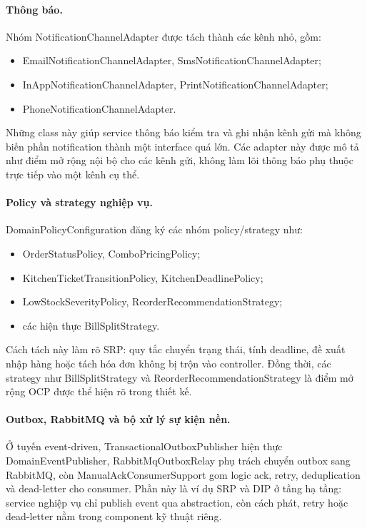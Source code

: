 \paragraph{Thông báo.}
Nhóm \textsf{NotificationChannelAdapter} được tách thành các kênh nhỏ, gồm:
\begin{itemize}
  \item \textsf{EmailNotificationChannelAdapter}, \textsf{SmsNotificationChannelAdapter};
  \item \textsf{InAppNotificationChannelAdapter}, \textsf{PrintNotificationChannelAdapter};
  \item \textsf{PhoneNotificationChannelAdapter}.
\end{itemize}
Những class này giúp service thông báo kiểm tra và ghi nhận kênh gửi mà không biến phần notification thành một interface quá lớn. Các adapter này được mô tả như điểm mở rộng nội bộ cho các kênh gửi, không làm lõi thông báo phụ thuộc trực tiếp vào một kênh cụ thể.

\paragraph{Policy và strategy nghiệp vụ.}
\textsf{DomainPolicyConfiguration} đăng ký các nhóm policy/strategy như:
\begin{itemize}
  \item \textsf{OrderStatusPolicy}, \textsf{ComboPricingPolicy};
  \item \textsf{KitchenTicketTransitionPolicy}, \textsf{KitchenDeadlinePolicy};
  \item \textsf{LowStockSeverityPolicy}, \textsf{ReorderRecommendationStrategy};
  \item các hiện thực \textsf{BillSplitStrategy}.
\end{itemize}
Cách tách này làm rõ SRP: quy tắc chuyển trạng thái, tính deadline, đề xuất nhập hàng hoặc tách hóa đơn không bị trộn vào controller. Đồng thời, các strategy như \textsf{BillSplitStrategy} và \textsf{ReorderRecommendationStrategy} là điểm mở rộng OCP được thể hiện rõ trong thiết kế.

\paragraph{Outbox, RabbitMQ và bộ xử lý sự kiện nền.}
Ở tuyến event-driven, \textsf{TransactionalOutboxPublisher} hiện thực \textsf{DomainEventPublisher}, \textsf{RabbitMqOutboxRelay} phụ trách chuyển outbox sang RabbitMQ, còn \textsf{ManualAckConsumerSupport} gom logic ack, retry, deduplication và dead-letter cho consumer. Phần này là ví dụ SRP và DIP ở tầng hạ tầng: service nghiệp vụ chỉ publish event qua abstraction, còn cách phát, retry hoặc dead-letter nằm trong component kỹ thuật riêng.

